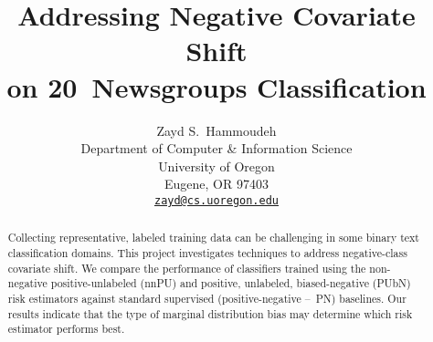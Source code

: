 \documentclass{article}
\title{Addressing Negative Covariate Shift \\ on 20~Newsgroups Classification}
\author{%
  Zayd S.\ Hammoudeh \\
  Department of Computer \& Information Science \\
  University of Oregon \\
  Eugene, OR 97403 \\
  \texttt{\href{mailto:zayd@cs.uoregon.edu}{zayd@cs.uoregon.edu}}
}
\begin{document}
\maketitle

\begin{abstract}
  Collecting representative, labeled training data can be challenging in some binary text classification domains. This project investigates techniques to address negative-class covariate shift.  We compare the performance of classifiers trained using the non-negative positive-unlabeled (nnPU) and positive, unlabeled, biased-negative (PUbN) risk estimators against standard supervised (positive-negative --~PN) baselines. Our results indicate that the type of marginal distribution bias may determine which risk estimator performs best.
\end{abstract}










\end{document}
